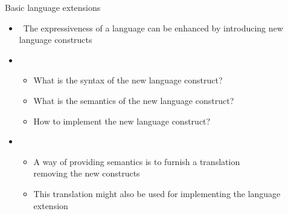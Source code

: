 \begin{frame}[c]{Basic language extensions}
  \bigskip
  \begin{itemize}
  \item {} \ The expressiveness of a language can be enhanced by introducing
    new language constructs
    \medskip
  \item<2-> 
    \smallskip
    \begin{itemize}\normalsize
    \item What is the \alert{syntax} of the new language construct?
    \item What is the \alert{semantics} of the new language construct?
    \item How to \alert{implement} the new language construct?
    \end{itemize}
    \medskip
  \item <3-> 
    \smallskip
    \begin{itemize}\normalsize
    \item A way of providing semantics is to furnish a \alert{translation}\\ removing the new constructs
      \smallskip
    \item This translation might also be used for implementing the language extension
  \end{itemize}
\end{itemize}
\end{frame}
%
